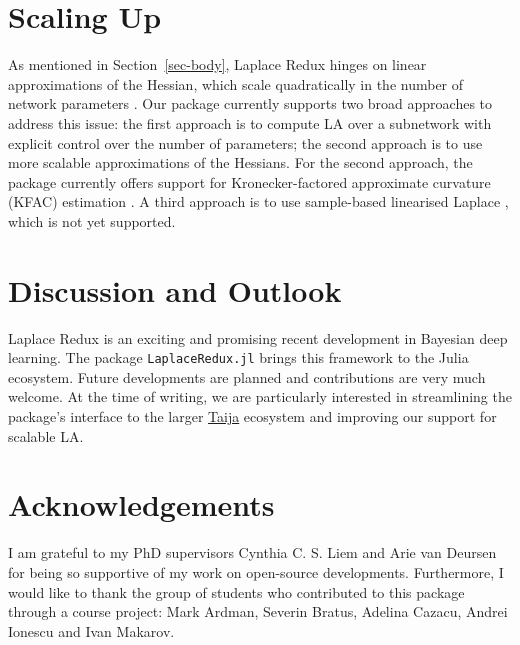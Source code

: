 \documentclass{juliacon}
\begin{document}
\section{Scaling Up}\label{sec-scale}

As mentioned in Section~\ref{sec-body}, Laplace Redux hinges on linear
approximations of the Hessian, which scale quadratically in the number
of network parameters \cite{daxberger2021laplace}. Our package currently
supports two broad approaches to address this issue: the first approach
is to compute LA over a subnetwork with explicit control over the number
of parameters; the second approach is to use more scalable
approximations of the Hessians. For the second approach, the package
currently offers support for Kronecker-factored approximate curvature
(KFAC) estimation \cite{martens2020optimizing}. A third approach is to
use sample-based linearised Laplace \cite{antoran2023samplingbased},
which is not yet supported.

\section{Discussion and Outlook}\label{sec-con}

Laplace Redux is an exciting and promising recent development in
Bayesian deep learning. The package \texttt{LaplaceRedux.jl} brings this
framework to the Julia ecosystem. Future developments are planned and
contributions are very much welcome. At the time of writing, we are
particularly interested in streamlining the package's interface to the
larger \href{https://github.com/JuliaTrustworthyAI}{Taija} ecosystem and
improving our support for scalable LA.

\section{Acknowledgements}\label{sec-ack}

I am grateful to my PhD supervisors Cynthia C. S. Liem and Arie van
Deursen for being so supportive of my work on open-source developments.
Furthermore, I would like to thank the group of students who contributed
to this package through a course project: Mark Ardman, Severin Bratus,
Adelina Cazacu, Andrei Ionescu and Ivan Makarov.


\end{document}
